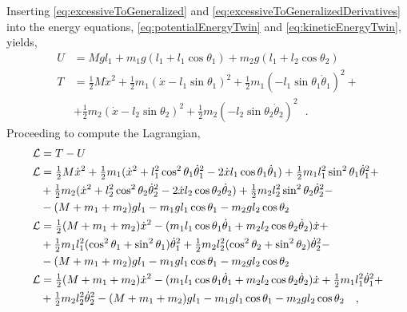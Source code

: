 Inserting \autoref{eq:excessiveToGeneralized} and \ref{eq:excessiveToGeneralizedDerivatives} into the energy equations, \autoref{eq:potentialEnergyTwin} and \ref{eq:kineticEnergyTwin}, yields,
%
\begin{align}
  U &= M g l_1 + m_1 g (l_1 + l_1 \cos \theta_1) + m_2 g (l_1 + l_2 \cos \theta_2)  \label{eq:potentialEnergyTwinGeneralized}  \\
  T &= \tfrac{1}{2} M \dot{x}^2 + \tfrac{1}{2} m_1 (\dot{x} - l_1 \sin \theta_1)^2  + \tfrac{1}{2} m_1 (-l_1 \sin \theta_1 \dot{\theta}_1)^2 + \nonumber \\
    &+ \tfrac{1}{2} m_2 (\dot{x} - l_2 \sin \theta_2)^2 + \tfrac{1}{2} m_2 (-l_2 \sin \theta_2 \dot{\theta}_2)^2 \label{eq:kineticEnergyTwinGeneralized} \ \ \ .
\end{align}
%
Proceeding to compute the Lagrangian,
\begin{align}
  \cal{L} &= T - U   \\ 
  \cal{L} &= \tfrac{1}{2} M \dot{x}^2 + \tfrac{1}{2} m_1 ( \dot{x}^2 + l_1^2 \cos ^2 \theta_1 \dot{\theta}_1^2 - 2 \dot{x} l_1 \cos \theta_1 \dot{\theta}_1 ) + \tfrac{1}{2} m_1 l_1^2 \sin ^2 \theta_1 \dot{\theta}_1^2 + \nonumber \\
          &+ \tfrac{1}{2} m_2 ( \dot{x}^2 + l_2^2 \cos ^2 \theta_2 \dot{\theta}_2^2 - 2 \dot{x} l_2 \cos \theta_2 \dot{\theta}_2 ) + \tfrac{1}{2} m_2 l_2^2 \sin ^2 \theta_2 \dot{\theta}_2^2 - \nonumber \\
          &-(M + m_1 + m_2) g l_1 - m_1 g l_1 \cos \theta_1 - m_2 g l_2 \cos \theta_2 \\
  \cal{L} &= \tfrac{1}{2} (M + m_1 + m_2) \dot{x}^2 - ( m_1 l_1 \cos \theta_1 \dot{\theta}_1 + m_2 l_2 \cos \theta_2 \dot{\theta}_2 ) \dot{x} + \nonumber \\
          &+ \tfrac{1}{2} m_1 l_1^2 (\cos^2 \theta_1 + \sin^2 \theta_1)\dot{\theta}_1^2 + \tfrac{1}{2} m_2 l_2^2 (\cos^2 \theta_2 + \sin^2 \theta_2)\dot{\theta}_2^2 - \nonumber \\
          &- (M + m_1 + m_2)g l_1 - m_1 g l_1 \cos \theta_1 - m_2 g l_2 \cos \theta_2  \\
  \cal{L} &= \tfrac{1}{2} (M + m_1 + m_2) \dot{x}^2 - ( m_1 l_1 \cos \theta_1 \dot{\theta}_1 + m_2 l_2 \cos \theta_2 \dot{\theta}_2 ) \dot{x} + \tfrac{1}{2} m_1 l_1^2 \dot{\theta}_1^2 + \nonumber \\
          &+ \tfrac{1}{2} m_2 l_2^2 \dot{\theta}_2^2 - (M + m_1 + m_2)g l_1 - m_1 g l_1 \cos \theta_1 - m_2 g l_2 \cos \theta_2
  \ \ \ , 
  \label{eq:lagrangian}
\end{align}
